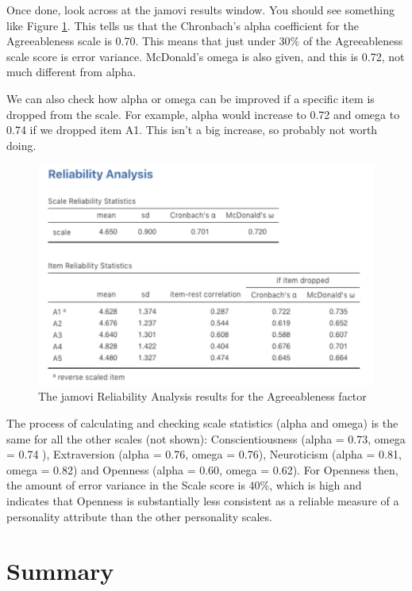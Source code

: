 \documentclass[
]{book}
\begin{document}
Once done, look across at the jamovi results window. You should see something like Figure \ref{fig:rel2}. This tells us that the Chronbach's alpha coefficient for the Agreeableness scale is 0.70. This means that just under 30\% of the Agreeableness scale score is error variance. McDonald's omega is also given, and this is 0.72, not much different from alpha.

We can also check how alpha or omega can be improved if a specific item is dropped from the scale. For example, alpha would increase to 0.72 and omega to 0.74 if we dropped item A1. This isn't a big increase, so probably not worth doing.

\begin{figure}

{\centering \includegraphics[width=1\linewidth]{img/factoranalysis/rel2} 

}

\caption{The jamovi Reliability Analysis results for the Agreeableness factor}\label{fig:rel2}
\end{figure}

The process of calculating and checking scale statistics (alpha and omega) is the same for all the other scales (not shown): Conscientiousness (alpha = 0.73, omega = 0.74 ), Extraversion (alpha = 0.76, omega = 0.76), Neuroticism (alpha = 0.81, omega = 0.82) and Openness (alpha = 0.60, omega = 0.62). For Openness then, the amount of error variance in the Scale score is 40\%, which is high and indicates that Openness is substantially less consistent as a reliable measure of a personality attribute than the other personality scales.

\hypertarget{summary-5}{%
\section{Summary}\label{summary-5}}
\end{document}
